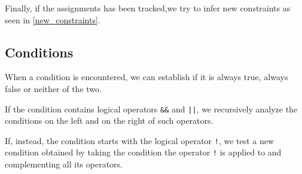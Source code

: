\documentclass{article}
\begin{document}
Finally, if the assignments has been tracked,we try to infer new constraints as seen in \ref{new_constraints}.

\subsection{Conditions}


When a condition is encountered, we can establish if it is always true, always false or neither of the two.

If the condition contains logical operators \texttt{\&\&} and \texttt{||}, we recursively analyze the conditions on the left and on the right of such operators.


If, instead, the condition starts with the logical operator \texttt{!}, we test a new condition obtained by taking the condition the operator \texttt{!} is applied to and complementing all its operators.
\end{document}
